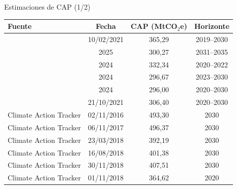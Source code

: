 \documentclass[xcolor=dvipsnames]{beamer}
\begin{document}
\begin{frame}{Estimaciones de CAP (1/2)}

\scriptsize

\begin{tabular}{l c c c}
\toprule
\textbf{Fuente} & \textbf{Fecha} & \textbf{CAP (MtCO$_2$e)} & \textbf{Horizonte} \\
\midrule
\cite{amigo_two_2021} & 10/02/2021 & 365,29 & 2019--2030 \\
\cite{ministerio_del_medio_ambiente_anteproyecto_2025} & 2025 & 300,27 & 2031--2035 \\
\cite{ministerio_del_medio_ambiente_reporte_2024} & 2024 & 332,34 & 2020--2022 \\
\cite{ministerio_del_medio_ambiente_reporte_2024} & 2024 & 296,67 & 2023--2030 \\
\cite{ministerio_de_energia_de_chile_plan_2024} & 2024 & 296,00 & 2020--2030 \\
\cite{gobierno_de_chile_estrategia_2021} & 21/10/2021 & 306,40 & 2020--2030 \\
\addlinespace
Climate Action Tracker & 02/11/2016 & 493,30 & 2030 \\
Climate Action Tracker & 06/11/2017 & 496,37 & 2030 \\
Climate Action Tracker & 23/03/2018 & 392,19 & 2030 \\
Climate Action Tracker & 16/08/2018 & 401,38 & 2030 \\
Climate Action Tracker & 30/11/2018 & 407,51 & 2030 \\
Climate Action Tracker & 01/11/2018 & 364,62 & 2020 \\
\bottomrule
\end{tabular}

\end{frame}
\end{document}
